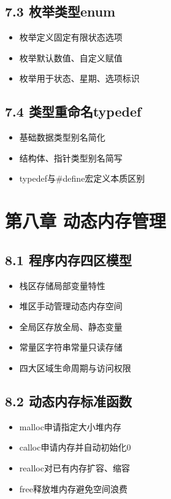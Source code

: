 \subsection{7.3 枚举类型enum}
\begin{itemize}
\item 枚举定义固定有限状态选项
\item 枚举默认数值、自定义赋值
\item 枚举用于状态、星期、选项标识
\end{itemize}

\subsection{7.4 类型重命名typedef}
\begin{itemize}
\item 基础数据类型别名简化
\item 结构体、指针类型别名简写
\item typedef与\#define宏定义本质区别
\end{itemize}

\section{第八章 动态内存管理}
\subsection{8.1 程序内存四区模型}
\begin{itemize}
\item 栈区存储局部变量特性
\item 堆区手动管理动态内存空间
\item 全局区存放全局、静态变量
\item 常量区字符串常量只读存储
\item 四大区域生命周期与访问权限
\end{itemize}

\subsection{8.2 动态内存标准函数}
\begin{itemize}
\item malloc申请指定大小堆内存
\item calloc申请内存并自动初始化0
\item realloc对已有内存扩容、缩容
\item free释放堆内存避免空间浪费
\end{itemize}

